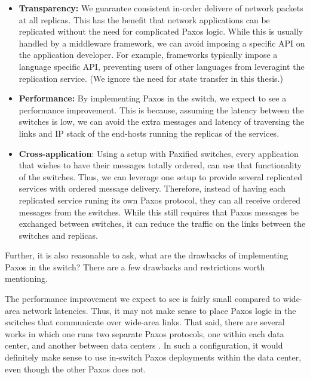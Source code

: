 \begin{itemize}
  \item \textbf{Transparency:} We guarantee consistent in-order delivere of
  network packets at all replicas.  This has the benefit that network
  applications can be replicated without the need for complicated Paxos
  logic. While this is usually handled by a middleware framework, we can
  avoid imposing a specific API on the application developer.  For example,
  frameworks typically impose a language specific API, preventing users of
  other languages from leveragint the replication service. (We ignore the
      need for state transfer in this thesis.)

  \item \textbf{Performance:} By implementing Paxos in the switch, we
  expect to see a performance improvement. This is because, assuming the
  latency between the switches is low, we can avoid the extra messages and
  latency of traversing the links and IP stack of the end-hosts running the
  replicas of the services.

  \item \textbf{Cross-application}: 
  Using a setup with Paxified switches, every application that wishes to
  have their messages totally ordered, can use that functionality of the
  switches. Thus, we can leverage one setup to provide several replicated
  services with ordered message delivery. Therefore, instead of having each
  replicated service runing its own Paxos protocol, they can all receive
  ordered messages from the switches. While this still requires that Paxos
  messages be exchanged between switches, it can reduce the traffic on the
  links between the switches and replicas.

\end{itemize}

Further, it is also reasonable to ask, what are the drawbacks of
implementing Paxos in the switch? There are a few drawbacks and restrictions
worth mentioning.

The performance improvement we expect to see is fairly small compared to
wide-area network latencies.  Thus, it may not make sense to place Paxos
logic in the switches that communicate over wide-area links. That said,
there are several works in which one runs two separate Paxos
protocols, one within each data center, and another between data
centers \cite{zorfu, steward, cft}.
In such a configuration, it would definitely make sense to use in-switch
Paxos deployments within the data center, even though the other Paxos does
not.

